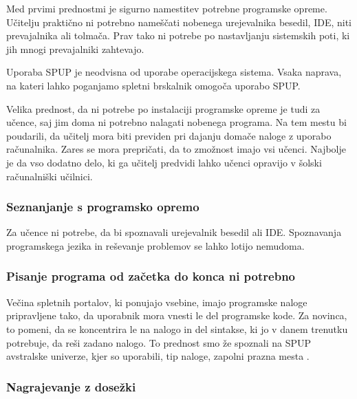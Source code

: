 Med prvimi prednostmi je sigurno namestitev potrebne programske
opreme. Učitelju praktično ni potrebno nameščati nobenega urejevalnika
besedil, IDE, niti prevajalnika ali tolmača. Prav tako ni potrebe po
nastavljanju sistemskih poti, ki jih mnogi prevajalniki zahtevajo.

Uporaba SPUP je neodvisna od uporabe operacijskega sistema. Vsaka
naprava, na kateri lahko poganjamo spletni brskalnik omogoča uporabo
SPUP.

Velika prednost, da ni potrebe po instalaciji programske opreme je
tudi za učence, saj jim doma ni potrebno nalagati nobenega
programa. Na tem mestu bi poudarili, da učitelj mora biti previden pri
dajanju domače naloge z uporabo računalnika. Zares se mora prepričati,
da to zmožnost imajo vsi učenci. Najbolje je da vso dodatno delo, ki
ga učitelj predvidi lahko učenci opravijo v šolski računalniški
učilnici.

\subsubsection{Seznanjanje s programsko opremo}
\label{sec:Seznanjanje_s_prog_opremo}

Za učence ni potrebe, da bi spoznavali urejevalnik besedil ali
IDE. Spoznavanja programskega jezika in reševanje problemov se lahko
lotijo nemudoma.


\subsubsection{Pisanje programa od začetka do konca ni potrebno}
\label{sec:pisanj_celega_progama}

Večina spletnih portalov, ki ponujajo vsebine, imajo programske naloge
pripravljene tako, da uporabnik mora vnesti le del programske kode. Za
novinca, to pomeni, da se koncentrira le na nalogo in del sintakse, ki
jo v danem trenutku potrebuje, da reši zadano nalogo. To prednost smo
že spoznali na SPUP avstralske univerze, kjer so uporabili, tip
naloge, zapolni prazna mesta \cite{thesisAWebP}.

\subsubsection{Nagrajevanje z dosežki}
\label{sec:nagrajevanje_s_dosežkov}

